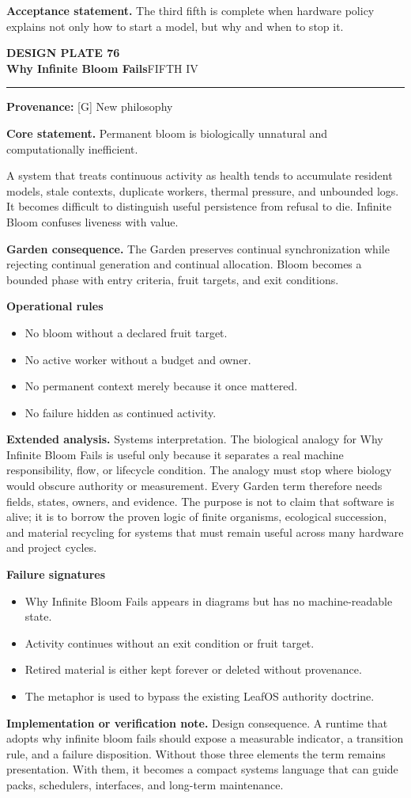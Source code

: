 \documentclass[10pt,letterpaper,oneside]{article}
\newcommand{\prov}[1]{\textcolor{gardenBlue}{\sffamily\footnotesize\textbf{Provenance:} #1}}
\newcommand{\platetitle}[3]{%
  \begin{minipage}[t][0.54in][t]{\textwidth}
  {\sffamily\bfseries\color{gardenDeep}\fontsize{9}{10}\selectfont DESIGN PLATE #1}\\[-1pt]
  {\sffamily\bfseries\color{gardenInk}\fontsize{16.5}{18}\selectfont #2}\hfill{\sffamily\color{gardenGreen}\large #3}
  \end{minipage}\vspace{-2pt}\hrule\vspace{5pt}}
\begin{document}
\begin{acceptbox}
\textbf{Acceptance statement.} The third fifth is complete when hardware policy explains not only how to start a model, but why and when to stop it.
\end{acceptbox}
\newpage
\platetitle{76}{Why Infinite Bloom Fails}{FIFTH IV}
\prov{[G] New philosophy}
\fontsize{8.85}{10.45}\selectfont
\begin{corebox}
\textbf{Core statement.} Permanent bloom is biologically unnatural and computationally inefficient.
\end{corebox}
A system that treats continuous activity as health tends to accumulate resident models, stale contexts, duplicate workers, thermal pressure, and unbounded logs. It becomes difficult to distinguish useful persistence from refusal to die. Infinite Bloom confuses liveness with value.

\textbf{Garden consequence.} The Garden preserves continual synchronization while rejecting continual generation and continual allocation. Bloom becomes a bounded phase with entry criteria, fruit targets, and exit conditions.

\textbf{Operational rules}
\begin{itemize}
\item No bloom without a declared fruit target.
\item No active worker without a budget and owner.
\item No permanent context merely because it once mattered.
\item No failure hidden as continued activity.
\end{itemize}
\textbf{Extended analysis.} Systems interpretation. The biological analogy for Why Infinite Bloom Fails is useful only because it separates a real machine responsibility, flow, or lifecycle condition. The analogy must stop where biology would obscure authority or measurement. Every Garden term therefore needs fields, states, owners, and evidence. The purpose is not to claim that software is alive; it is to borrow the proven logic of finite organisms, ecological succession, and material recycling for systems that must remain useful across many hardware and project cycles.

\textbf{Failure signatures}
\begin{itemize}
\item Why Infinite Bloom Fails appears in diagrams but has no machine-readable state.
\item Activity continues without an exit condition or fruit target.
\item Retired material is either kept forever or deleted without provenance.
\item The metaphor is used to bypass the existing LeafOS authority doctrine.
\end{itemize}
\textbf{Implementation or verification note.} Design consequence. A runtime that adopts why infinite bloom fails should expose a measurable indicator, a transition rule, and a failure disposition. Without those three elements the term remains presentation. With them, it becomes a compact systems language that can guide packs, schedulers, interfaces, and long-term maintenance.
\end{document}
